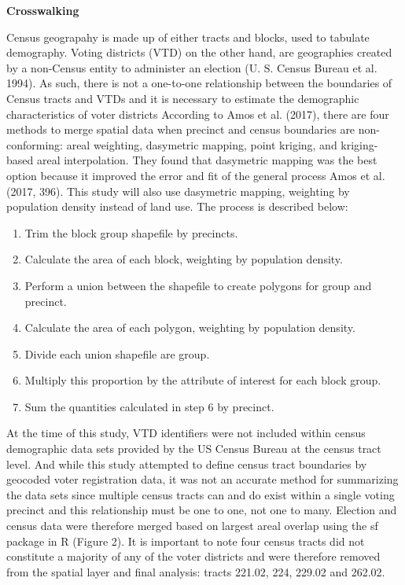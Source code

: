 \documentclass[
]{article}
\providecommand{\tightlist}{%
  \setlength{\itemsep}{0pt}\setlength{\parskip}{0pt}}
\begin{document}
\textbf{Crosswalking}

Census geograpahy is made up of either tracts and blocks, used to
tabulate demography. Voting districts (VTD) on the other hand, are
geographies created by a non-Census entity to administer an election (U.
S. Census Bureau et al. 1994). As such, there is not a one-to-one
relationship between the boundaries of Census tracts and VTDs and it is
necessary to estimate the demographic characteristics of voter districts
According to Amos et al. (2017), there are four methods to merge spatial
data when precinct and census boundaries are non-conforming: areal
weighting, dasymetric mapping, point kriging, and kriging-based areal
interpolation. They found that dasymetric mapping was the best option
because it improved the error and fit of the general process Amos et al.
(2017, 396). This study will also use dasymetric mapping, weighting by
population density instead of land use. The process is described below:

\begin{enumerate}
\def\labelenumi{\arabic{enumi}.}
\tightlist
\item
  Trim the block group shapefile by precincts.
\item
  Calculate the area of each block, weighting by population density.
\item
  Perform a union between the shapefile to create polygons for group and
  precinct.
\item
  Calculate the area of each polygon, weighting by population density.
\item
  Divide each union shapefile are group.
\item
  Multiply this proportion by the attribute of interest for each block
  group.
\item
  Sum the quantities calculated in step 6 by precinct.
\end{enumerate}

At the time of this study, VTD identifiers were not included within
census demographic data sets provided by the US Census Bureau at the
census tract level. And while this study attempted to define census
tract boundaries by geocoded voter registration data, it was not an
accurate method for summarizing the data sets since multiple census
tracts can and do exist within a single voting precinct and this
relationship must be one to one, not one to many. Election and census
data were therefore merged based on largest areal overlap using the sf
package in R (Figure 2). It is important to note four census tracts did
not constitute a majority of any of the voter districts and were
therefore removed from the spatial layer and final analysis: tracts
221.02, 224, 229.02 and 262.02.
\end{document}
